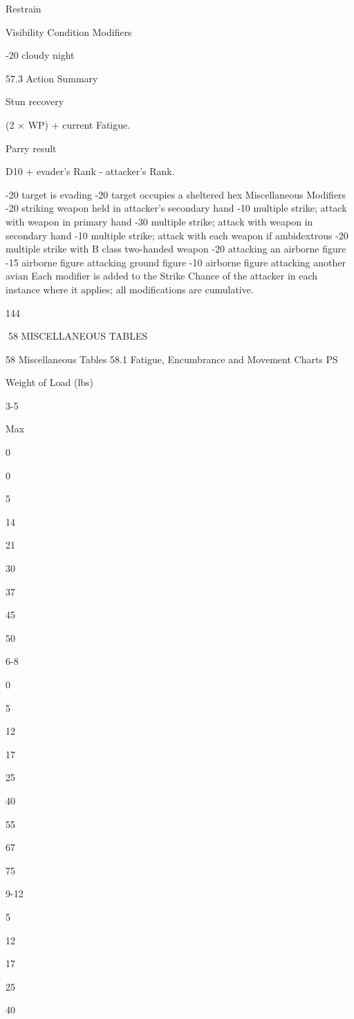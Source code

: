 \documentclass[a4paper]{article}
\begin{document}
\begin{multicols}{3}
Restrain

Visibility Condition Modifiers

-20 cloudy night

57.3 Action Summary

Stun recovery

(2 × WP) + current Fatigue.

Parry result

D10 + evader’s Rank - attacker’s Rank.

-20 target is evading
-20 target occupies a sheltered hex
Miscellaneous Modifiers
-20 striking weapon held in attacker’s secondary
hand
-10 multiple strike; attack with weapon in primary hand
-30 multiple strike; attack with weapon in secondary hand
-10 multiple strike; attack with each weapon if
ambidextrous
-20 multiple strike with B class two-handed
weapon
-20 attacking an airborne figure
-15 airborne figure attacking ground figure
-10 airborne figure attacking another avian
Each modifier is added to the Strike Chance of the
attacker in each instance where it applies; all modifications are cumulative.

144

58 MISCELLANEOUS TABLES

58 Miscellaneous Tables
58.1 Fatigue, Encumbrance and Movement Charts
PS

Weight of Load (lbs)

3-5

Max

0

0

5

14

21

30

37

45

50

6-8

0

5

12

17

25

40

55

67

75

9-12

5

12

17

25

40


\end{multicols}
\end{document}
